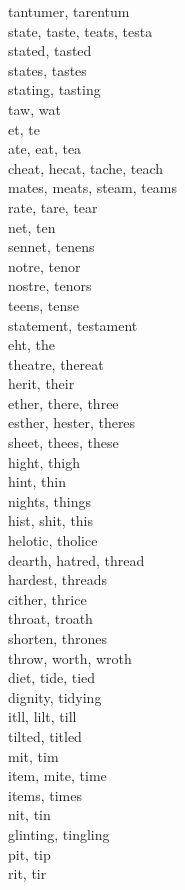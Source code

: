 tantumer, tarentum\\
state, taste, teats, testa\\
stated, tasted\\
states, tastes\\
stating, tasting\\
taw, wat\\
et, te\\
ate, eat, tea\\
cheat, hecat, tache, teach\\
mates, meats, steam, teams\\
rate, tare, tear\\
net, ten\\
sennet, tenens\\
notre, tenor\\
nostre, tenors\\
teens, tense\\
statement, testament\\
eht, the\\
theatre, thereat\\
herit, their\\
ether, there, three\\
esther, hester, theres\\
sheet, thees, these\\
hight, thigh\\
hint, thin\\
nights, things\\
hist, shit, this\\
helotic, tholice\\
dearth, hatred, thread\\
hardest, threads\\
cither, thrice\\
throat, troath\\
shorten, thrones\\
throw, worth, wroth\\
diet, tide, tied\\
dignity, tidying\\
itll, lilt, till\\
tilted, titled\\
mit, tim\\
item, mite, time\\
items, times\\
nit, tin\\
glinting, tingling\\
pit, tip\\
rit, tir\\
